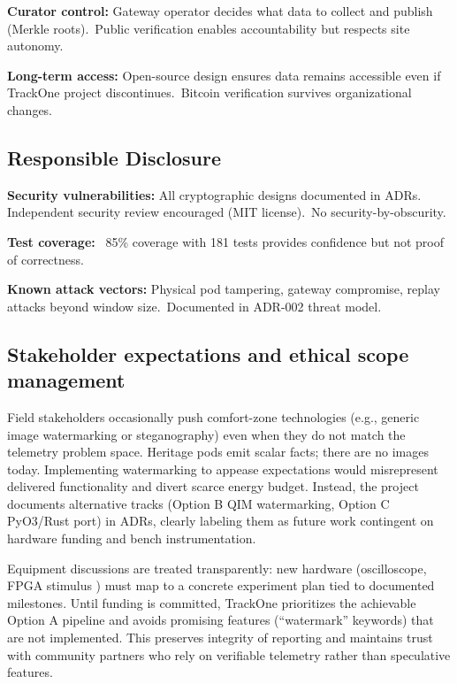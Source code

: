 \textbf{Curator control:} Gateway operator decides what data to collect and publish (Merkle roots).\ Public verification enables accountability but respects site autonomy.

\textbf{Long-term access:} Open-source design ensures data remains accessible even if TrackOne project discontinues.\ Bitcoin verification survives organizational changes.

\subsection{Responsible Disclosure}\label{subsec:responsible-disclosure}

\textbf{Security vulnerabilities:} All cryptographic designs documented in \ac{ADR}s. Independent security review encouraged (MIT license).\ No security-by-obscurity.

\textbf{Test coverage:} ~85\% coverage with 181 tests provides confidence but not proof of correctness.

\textbf{Known attack vectors:} Physical pod tampering, gateway compromise, replay attacks beyond window size.\ Documented in \ac{ADR}-002 threat model.

\subsection{Stakeholder expectations and ethical scope management}\label{subsec:stakeholder-expectations-and-ethical-scope-management}
Field stakeholders occasionally push comfort-zone technologies (e.g., generic image watermarking or steganography) even when they do not match the telemetry problem space.
Heritage pods emit scalar facts; there are no images today.
Implementing watermarking to appease expectations would misrepresent delivered functionality and divert scarce energy budget.
Instead, the project documents alternative tracks (Option B QIM watermarking, Option C PyO3/Rust port) in \ac{ADR}s, clearly labeling them as future work contingent on hardware funding and bench instrumentation.

Equipment discussions are treated transparently: new hardware (oscilloscope, FPGA stimulus%
) must map to a concrete experiment plan tied to documented milestones.
Until funding is committed, TrackOne prioritizes the achievable Option A pipeline and avoids promising features (``watermark'' keywords) that are not implemented.
This preserves integrity of reporting and maintains trust with community partners who rely on verifiable telemetry rather than speculative features.


